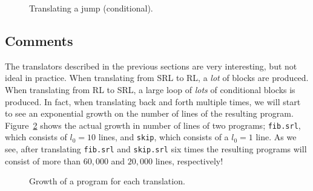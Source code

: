 \begin{figure}[H]
  
  \caption{Translating a jump (conditional).}\label{fig:rltrlJumpIf}
\end{figure}

\subsection{Comments}
The translators described in the previous sections are very interesting, but not ideal in practice. When translating from SRL to RL, a \textit{lot} of blocks are produced. When translating from RL to SRL, a large loop of \textit{lots} of conditional blocks is produced. In fact, when translating back and forth multiple times, we will start to see an exponential growth on the number of lines of the resulting program. Figure~\ref{fig:linesfig} shows the actual growth in number of lines of two programs; \texttt{fib.srl}, which consists of $l_0=10$ lines, and \texttt{skip}, which consists of a $l_0=1$ line. As we see, after translating \texttt{fib.srl} and \texttt{skip.srl} six times the resulting programs will consist of more than $60,000$ and $20,000$ lines, respectively!

\pgfplotsset{compat = 1.3}
\begin{figure}[H]
\centering


  \caption{Growth of a program for each translation.}\label{fig:linesfig}%
\end{figure}
